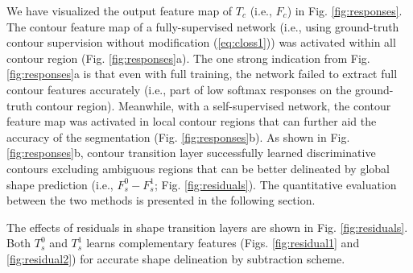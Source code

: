 \documentclass[journal]{IEEEtran}
\begin{document}
We have visualized the output feature map of $T_c$ (i.e., $F_c$) in Fig. \ref{fig:responses}. The contour feature map of a fully-supervised network (i.e., using ground-truth contour supervision without modification (\ref{eq:closs1})) was activated within all contour region (Fig. \ref{fig:responses}a). The one strong indication from Fig. \ref{fig:responses}a is that even with full training, the network failed to extract full contour features accurately (i.e., part of low softmax responses on the ground-truth contour region). Meanwhile, with a self-supervised network, the contour feature map was activated in local contour regions that can further aid the accuracy of the segmentation (Fig. \ref{fig:responses}b). As shown in Fig. \ref{fig:responses}b, contour transition layer successfully learned discriminative contours excluding ambiguous regions that can be better delineated by global shape prediction (i.e., $F^0_s-F^1_s$; Fig. \ref{fig:residuals}). The quantitative evaluation between the two methods is presented in the following section.\par
The effects of residuals in shape transition layers are shown in Fig. \ref{fig:residuals}. Both \(T^0_s\) and \(T^1_s\) learns complementary features (Figs. \ref{fig:residual1} and \ref{fig:residual2}) for accurate shape delineation by subtraction scheme.

\end{document}
